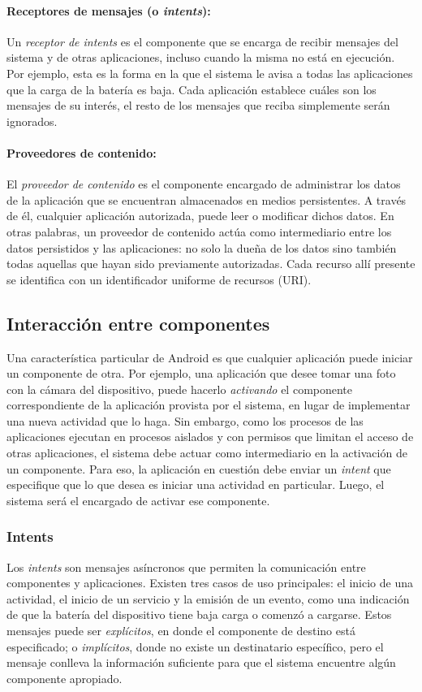 \paragraph{Receptores de mensajes (o \textit{intents}): }
Un \textit{receptor de intents} es el componente que se encarga de recibir mensajes del sistema y de
otras aplicaciones, incluso cuando la misma no está en ejecución. Por ejemplo, esta es la forma en la
que el sistema le avisa a todas las aplicaciones que la carga de la batería es baja. Cada aplicación
establece cuáles son los mensajes de su interés, el resto de los mensajes que reciba simplemente serán
ignorados.

\paragraph{Proveedores de contenido:}
El \textit{proveedor de contenido} es el componente encargado de administrar los datos de la
aplicación que se encuentran almacenados en medios persistentes. A través de él, cualquier aplicación
autorizada, puede leer o modificar dichos datos. En otras palabras, un proveedor de contenido actúa
como intermediario entre los datos persistidos y las aplicaciones: no solo la dueña de los datos sino
también todas aquellas que hayan sido previamente autorizadas. Cada recurso allí presente se
identifica con un identificador uniforme de recursos (URI).

\subsection{Interacción entre componentes}
Una característica particular de Android es que cualquier aplicación puede iniciar un componente de
otra. Por ejemplo, una aplicación que desee tomar una foto con la cámara del dispositivo, puede
hacerlo \textit{activando} el componente correspondiente de la aplicación provista por el sistema, en
lugar de implementar una nueva actividad que lo haga. Sin embargo, como los procesos de las
aplicaciones ejecutan en procesos aislados y con permisos que limitan el acceso de otras aplicaciones,
el sistema debe actuar como intermediario en la activación de un componente. Para eso, la aplicación
en cuestión debe enviar un \textit{intent} que especifique que lo que desea es iniciar una actividad
en particular. Luego, el sistema será el encargado de activar ese componente.

\subsubsection*{Intents}
Los \textit{intents} son mensajes asíncronos que permiten la comunicación entre componentes y
aplicaciones. Existen tres casos de uso principales: el inicio de una actividad, el inicio de un
servicio y la emisión de un evento, como una indicación de que la batería del dispositivo tiene baja
carga o comenzó a cargarse. Estos mensajes puede ser \textit{explícitos}, en donde el componente de
destino está especificado; o \textit{implícitos}, donde no existe un destinatario específico, pero el
mensaje conlleva la información suficiente para que el sistema encuentre algún componente apropiado.

